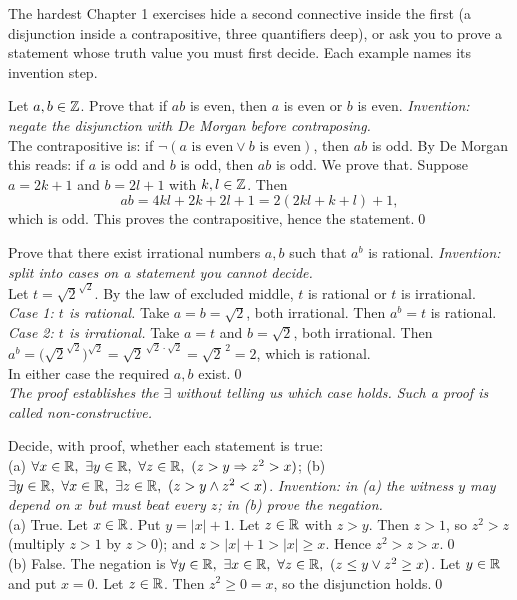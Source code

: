 The hardest Chapter 1 exercises hide a second connective inside the first (a disjunction inside a contrapositive, three quantifiers deep), or ask you to prove a statement whose truth value you must first decide. Each example names its invention step.

\begin{bexample}
Let $a,b\in\mathbb{Z}$. Prove that if $ab$ is even, then $a$ is even or $b$ is even.
\solution
\emph{Invention: negate the disjunction with De Morgan before contraposing.}\\
The contrapositive is: if $\neg(a\text{ is even}\vee b\text{ is even})$, then $ab$ is odd. By De Morgan this reads: if $a$ is odd and $b$ is odd, then $ab$ is odd. We prove that. Suppose $a=2k+1$ and $b=2l+1$ with $k,l\in\mathbb{Z}$. Then
\[
ab=4kl+2k+2l+1=2(2kl+k+l)+1,
\]
which is odd. This proves the contrapositive, hence the statement.\qed
\end{bexample}

\begin{bexample}
Prove that there exist irrational numbers $a,b$ such that $a^b$ is rational.
\solution
\emph{Invention: split into cases on a statement you cannot decide.}\\
Let $t=\sqrt2^{\sqrt2}$. By the law of excluded middle, $t$ is rational or $t$ is irrational.\\
\emph{Case 1: $t$ is rational.} Take $a=b=\sqrt2$, both irrational. Then $a^b=t$ is rational.\\
\emph{Case 2: $t$ is irrational.} Take $a=t$ and $b=\sqrt2$, both irrational. Then
$a^b=\big(\sqrt2^{\sqrt2}\big)^{\sqrt2}=\sqrt2^{\,\sqrt2\cdot\sqrt2}=\sqrt2^{\,2}=2$, which is rational.\\
In either case the required $a,b$ exist.\qed\\
\emph{The proof establishes the $\exists$ without telling us which case holds. Such a proof is called non-constructive.}
\end{bexample}

\begin{bexample}
Decide, with proof, whether each statement is true:\\
(a) $\forall x\in\mathbb{R},\ \exists y\in\mathbb{R},\ \forall z\in\mathbb{R},\ (z>y\Rightarrow z^2>x)$;\qquad
(b) $\exists y\in\R,\ \forall x\in\R,\ \exists z\in\R,\ (z>y\wedge z^2<x)$.
\solution
\emph{Invention: in (a) the witness $y$ may depend on $x$ but must beat every $z$; in (b) prove the negation.}\\
(a) True. Let $x\in\mathbb{R}$. Put $y=|x|+1$. Let $z\in\mathbb{R}$ with $z>y$. Then $z>1$, so $z^2>z$ (multiply $z>1$ by $z>0$); and $z>|x|+1>|x|\ge x$. Hence $z^2>z>x$.\qed\\
(b) False. The negation is $\forall y\in\R,\ \exists x\in\R,\ \forall z\in\R,\ (z\le y\vee z^2\ge x)$. Let $y\in\mathbb{R}$ and put $x=0$. Let $z\in\mathbb{R}$. Then $z^2\ge0=x$, so the disjunction holds.\qed
\end{bexample}

